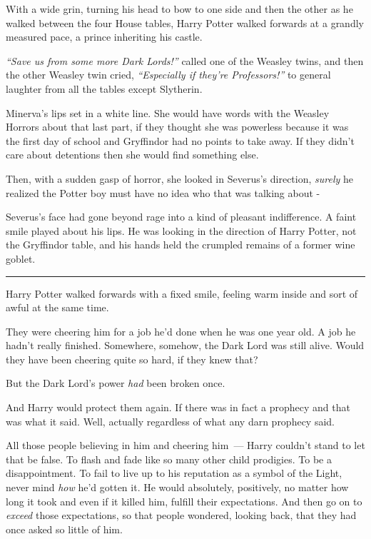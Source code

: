 With a wide grin, turning his head to bow to one side and then the other as he walked between the four House tables, Harry Potter walked forwards at a grandly measured pace, a prince inheriting his castle.

\emph{``Save us from some more Dark Lords!''} called one of the Weasley twins, and then the other Weasley twin cried, \emph{``Especially if they're Professors!''} to general laughter from all the tables except Slytherin.

Minerva's lips set in a white line. She would have words with the Weasley Horrors about that last part, if they thought she was powerless because it was the first day of school and Gryffindor had no points to take away. If they didn't care about detentions then she would find something else.

Then, with a sudden gasp of horror, she looked in Severus's direction, \emph{surely} he realized the Potter boy must have no idea who that was talking about -

Severus's face had gone beyond rage into a kind of pleasant indifference. A faint smile played about his lips. He was looking in the direction of Harry Potter, not the Gryffindor table, and his hands held the crumpled remains of a former wine goblet.

\begin{center}\rule{3in}{0.4pt}\end{center}

Harry Potter walked forwards with a fixed smile, feeling warm inside and sort of awful at the same time.

They were cheering him for a job he'd done when he was one year old. A job he hadn't really finished. Somewhere, somehow, the Dark Lord was still alive. Would they have been cheering quite so hard, if they knew that?

But the Dark Lord's power \emph{had} been broken once.

And Harry would protect them again. If there was in fact a prophecy and that was what it said. Well, actually regardless of what any darn prophecy said.

All those people believing in him and cheering him~--- Harry couldn't stand to let that be false. To flash and fade like so many other child prodigies. To be a disappointment. To fail to live up to his reputation as a symbol of the Light, never mind \emph{how} he'd gotten it. He would absolutely, positively, no matter how long it took and even if it killed him, fulfill their expectations. And then go on to \emph{exceed} those expectations, so that people wondered, looking back, that they had once asked so little of him.

